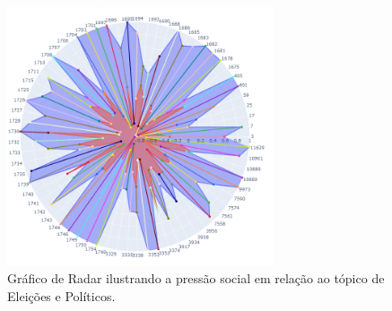 \begin{figure}[htb]
	\centering
	\includegraphics[width=0.7\textwidth]{images/social_barometer_polititians.png}
	\caption{Gráfico de Radar ilustrando a pressão social em relação ao tópico de Eleições e Políticos.}
	\label{fig:social_barometer_polititians}
\end{figure}

